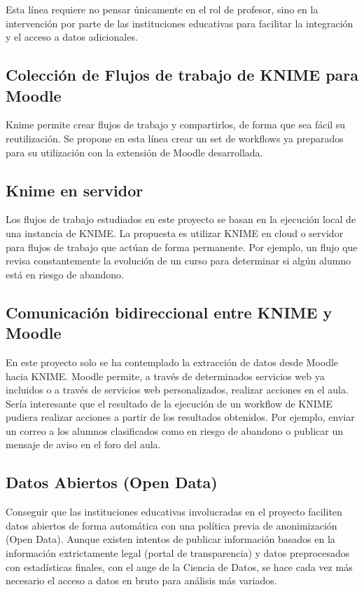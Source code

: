 Esta línea requiere no pensar únicamente en el rol de profesor, sino en la intervención por parte de las instituciones educativas para facilitar la integración 
y el acceso a datos adicionales. 


\subsection{Colección de Flujos de trabajo de KNIME para Moodle}

Knime permite crear flujos de trabajo y compartirlos, de forma que sea fácil su reutilización. Se propone en esta línea crear un set de 
workflows ya preparados para su utilización con la extensión de Moodle desarrollada. 


\subsection{Knime en servidor}

Los flujos de trabajo estudiados en este proyecto se basan en la ejecución local de una instancia de KNIME. La propuesta es utilizar 
KNIME en cloud o servidor para flujos de trabajo que actúan de forma permanente. Por ejemplo, un flujo que revisa constantemente la evolución de un curso para 
determinar si algún alumno está en riesgo de abandono. 

\subsection{Comunicación bidireccional entre KNIME y Moodle}

En este proyecto solo se ha contemplado la extracción de datos desde Moodle hacia KNIME. Moodle permite, a través de determinados 
servicios web ya incluidos o a través de servicios web personalizados, realizar acciones en el aula. Sería interesante que el resultado 
de la ejecución de un workflow de KNIME pudiera realizar acciones a partir de los resultados obtenidos. Por ejemplo, enviar un correo a
 los alumnos clasificados como en riesgo de abandono o publicar un mensaje de aviso en el foro del aula. 
 
\subsection{Datos Abiertos (Open Data)}

Conseguir que las instituciones educativas involucradas en el proyecto faciliten datos abiertos de forma automática con una política previa de anonimización (Open Data). 
Aunque existen intentos de publicar información basados en la información extrictamente legal (portal de transparencia) y datos preprocesados 
con estadísticas finales, con el auge de la Ciencia de Datos, se hace cada vez más necesario el acceso a datos en bruto para análisis más variados. 

